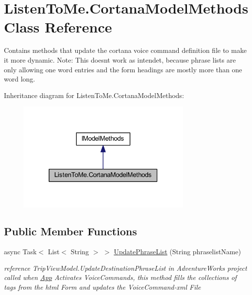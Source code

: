 \hypertarget{class_listen_to_me_1_1_cortana_model_methods}{}\section{Listen\+To\+Me.\+Cortana\+Model\+Methods Class Reference}
\label{class_listen_to_me_1_1_cortana_model_methods}


Contains methods that update the cortana voice command definition file to make it more dynamic. Note\+: This doesn\textquotesingle{}t work as intendet, because phrase lists are only allowing one word entries and the form headings are mostly more than one word long.  




Inheritance diagram for Listen\+To\+Me.\+Cortana\+Model\+Methods\+:\nopagebreak
\begin{figure}[H]
\begin{center}
\leavevmode
\includegraphics[width=247pt]{class_listen_to_me_1_1_cortana_model_methods__inherit__graph}
\end{center}
\end{figure}
\subsection*{Public Member Functions}
\begin{DoxyCompactItemize}
\item 
async Task$<$ List$<$ String $>$ $>$ \mbox{\hyperlink{class_listen_to_me_1_1_cortana_model_methods_afe872337c3f1c74f5db6e26918f29ac1}{Update\+Phrase\+List}} (String phraselist\+Name)
\begin{DoxyCompactList}\small\item\em reference Trip\+View\+Model.\+Update\+Destination\+Phrase\+List in Adventure\+Works project called when \mbox{\hyperlink{class_listen_to_me_1_1_app}{App}} Activates Voice\+Commands, this method fills the collections of tags from the html Form and updates the Voice\+Command-\/xml File \end{DoxyCompactList}\end{DoxyCompactItemize}


